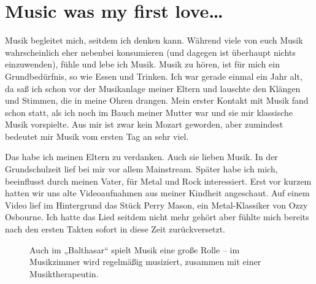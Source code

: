 \documentclass[fontsize=14pt,a4paper,headinclude,DIV=calc,automark]{scrbook}
\begin{document}
\section{Music was my first love…}

Musik begleitet mich, seitdem ich denken kann. Während viele von euch Musik wahrscheinlich eher nebenbei konsumieren (und dagegen ist überhaupt nichts einzuwenden), fühle und lebe ich Musik. Musik zu hören, ist für mich ein Grundbedürfnis, so wie Essen und Trinken. Ich war gerade einmal ein Jahr alt, da saß ich schon vor der Musikanlage meiner Eltern und lauschte den Klängen und Stimmen, die in meine Ohren drangen. Mein erster Kontakt mit Musik fand schon statt, als ich noch im Bauch meiner Mutter war und sie mir klassische Musik vorspielte. Aus mir ist zwar kein Mozart geworden, aber zumindest bedeutet mir Musik vom ersten Tag an sehr viel.

Das habe ich meinen Eltern zu verdanken. Auch sie lieben Musik. In der Grundschulzeit lief bei mir vor allem Mainstream. Später habe ich mich, beeinflusst durch meinen Vater, für Metal und Rock interessiert. Erst vor kurzem hatten wir uns alte Videoaufnahmen aus meiner Kindheit angeschaut. Auf einem Video lief im Hintergrund das Stück Perry Mason, ein Metal-Klassiker von Ozzy Osbourne. Ich hatte das Lied seitdem nicht mehr gehört aber fühlte mich bereits nach den ersten Takten sofort in diese Zeit zurückversetzt.

\setlength{\fboxsep}{0pt}    %
\setlength{\fboxrule}{0.2pt} %
\begin{figure}[ht]
    \raggedright
    \caption{Auch im „Balthasar“ spielt Musik eine große Rolle – im Musikzimmer wird regelmäßig musiziert, zusammen mit einer Musiktherapeutin.}
    \label{fig:musikzimmer}
\end{figure}
\end{document}

